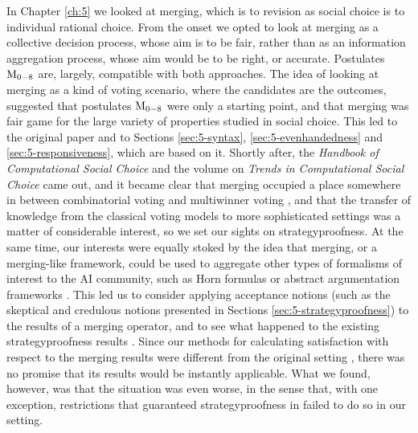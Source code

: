 In Chapter \ref{ch:5} we looked at merging, which is to revision 
as social choice is to individual rational choice.
From the onset we opted to look at merging as a collective decision 
process, whose aim is to be fair, rather than as an information aggregation
process, whose aim would be to be right, or accurate. Postulates $\mathrm{M}_{0-8}$ 
are, largely, compatible with both approaches.
The idea of looking at merging as a kind of voting scenario, where the candidates 
are the outcomes, suggested that postulates $\mathrm{M}_{0-8}$ were only a starting point, and 
that merging was fair game for the large variety of 
properties studied in social choice.
This led to the original paper \cite{HaretPW16} and to Sections \ref{sec:5-syntax}, 
\ref{sec:5-evenhandedness} and \ref{sec:5-responsiveness}, which are based on it.
Shortly after, the \emph{Handbook of Computational Social Choice} \cite{BrandtCELP2016} 
and the volume on \emph{Trends in Computational Social Choice} \cite{Endriss17} came out, 
and it became clear that merging occupied a place somewhere in between 
combinatorial voting \cite{LangX16} and multiwinner voting \cite{FaliszewskiSST17},
and that the transfer of knowledge from the classical voting models to more 
sophisticated settings was a matter of considerable interest,
so we set our sights on strategyproofness.
At the same time, our interests were equally stoked by the idea that merging, 
or a merging-like framework, could be used to aggregate other types of formalisms of 
interest to the AI community, such as Horn formulas \cite{HaretRW15,HaretRW17} or 
abstract argumentation frameworks \cite{DelobelleHKMRW16}. 
This led us to consider applying acceptance notions 
(such as the skeptical and credulous notions presented in Sections \ref{sec:5-strategyproofness})
to the results of a merging operator, and to see what happened to the 
existing strategyproofness results \cite{EveraereKM07}. Since our methods for calculating 
satisfaction with respect to the merging results were different from the original setting \cite{EveraereKM07},
there was no promise that its results would be instantly applicable. What we found, however, was that 
the situation was even worse, in the sense that, with one exception, 
restrictions that guaranteed strategyproofness in \cite{EveraereKM07} 
failed to do so in our setting.

